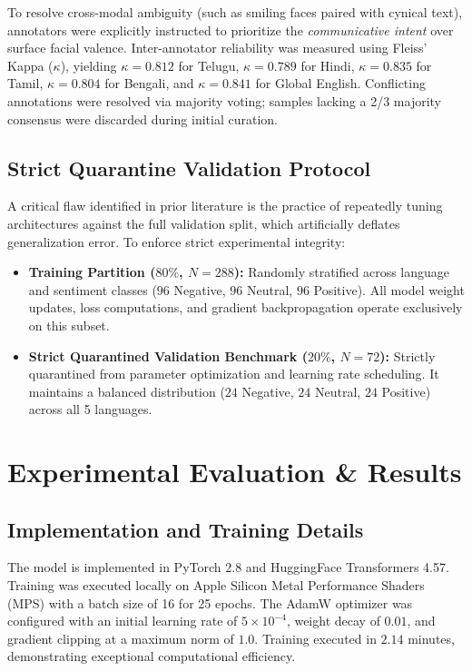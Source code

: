 \documentclass[10pt,journal,compsoc]{IEEEtran}
\begin{document}
To resolve cross-modal ambiguity (such as smiling faces paired with cynical text), annotators were explicitly instructed to prioritize the \textit{communicative intent} over surface facial valence. Inter-annotator reliability was measured using Fleiss' Kappa ($\kappa$), yielding $\kappa = 0.812$ for Telugu, $\kappa = 0.789$ for Hindi, $\kappa = 0.835$ for Tamil, $\kappa = 0.804$ for Bengali, and $\kappa = 0.841$ for Global English. Conflicting annotations were resolved via majority voting; samples lacking a 2/3 majority consensus were discarded during initial curation.

\subsection{Strict Quarantine Validation Protocol}
A critical flaw identified in prior literature is the practice of repeatedly tuning architectures against the full validation split, which artificially deflates generalization error. To enforce strict experimental integrity:
\begin{itemize}
    \item \textbf{Training Partition ($80\%$, $N=288$):} Randomly stratified across language and sentiment classes ($96$ Negative, $96$ Neutral, $96$ Positive). All model weight updates, loss computations, and gradient backpropagation operate exclusively on this subset.
    \item \textbf{Strict Quarantined Validation Benchmark ($20\%$, $N=72$):} Strictly quarantined from parameter optimization and learning rate scheduling. It maintains a balanced distribution ($24$ Negative, $24$ Neutral, $24$ Positive) across all 5 languages.
\end{itemize}

\section{Experimental Evaluation \& Results}
\label{sec:experiments}

\subsection{Implementation and Training Details}
The model is implemented in PyTorch 2.8 and HuggingFace Transformers 4.57. Training was executed locally on Apple Silicon Metal Performance Shaders (MPS) with a batch size of 16 for 25 epochs. The AdamW optimizer was configured with an initial learning rate of $5 \times 10^{-4}$, weight decay of $0.01$, and gradient clipping at a maximum norm of $1.0$. Training executed in $2.14$ minutes, demonstrating exceptional computational efficiency.
\end{document}
